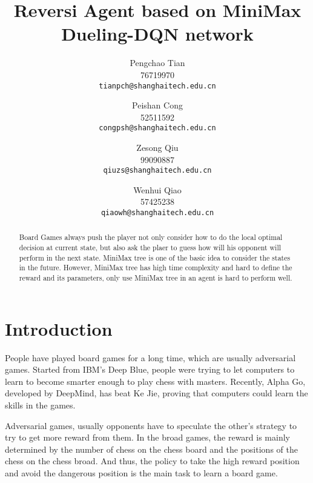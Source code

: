 \documentclass[10pt,twocolumn,letterpaper]{article}
\begin{document}
\title{Reversi Agent based on MiniMax Dueling-DQN network}

\author{
Pengchao Tian\\
76719970\\
{\tt\small tianpch@shanghaitech.edu.cn}
\and
Peishan Cong\\
52511592\\
{\tt\small congpsh@shanghaitech.edu.cn}
\and
Zesong Qiu\\
99090887\\
{\tt\small qiuzs@shanghaitech.edu.cn}
\and 
Wenhui Qiao\\
57425238\\
{\tt\small qiaowh@shanghaitech.edu.cn}
}

\maketitle

\begin{abstract}
   Board Games always push the player not only consider 
   how to do the local optimal decision at current 
   state, but also ask the plaer to guess  how will 
   his opponent will perform in the next state. MiniMax 
   tree is one of the basic idea to consider the states 
   in the future. However, MiniMax tree has high time 
   complexity and hard to define the reward and its 
   parameters, only use MiniMax tree in an agent is hard 
   to perform well. 
   
   
\end{abstract}

\section{Introduction}

People have played board games for a long time, which 
are usually adversarial games. Started from IBM's Deep 
Blue, people were trying to let computers to learn 
to become smarter enough to play chess with masters. 
Recently, Alpha Go, developed by DeepMind, has beat 
Ke Jie, proving that computers could learn the skills 
in the games. 

Adversarial games, usually opponents have to speculate 
the other's strategy to try to get more reward from them. 
In the broad games, the reward is mainly determined by 
the number of chess on the chess board and the positions 
of the chess on the chess broad. And thus, the policy 
to take the high reward position and avoid the 
dangerous position is the main task to learn a 
board game. 
\end{document}
